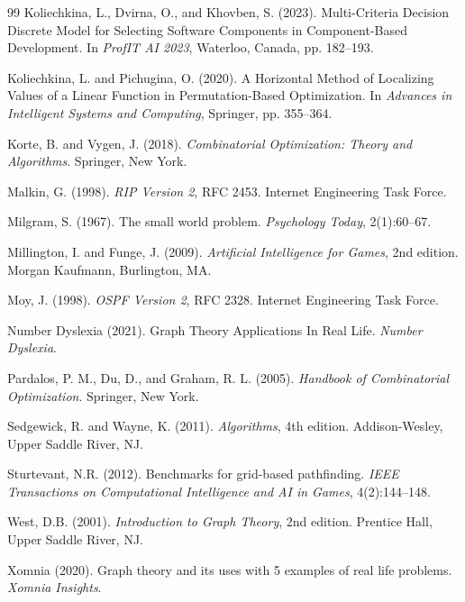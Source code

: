 \documentclass[12pt, a4paper, oneside]{report}
\theoremstyle{definition}
\begin{document}
\begin{thebibliography}{99}
Koliechkina, L., Dvirna, O., and Khovben, S. (2023).
\newblock Multi-Criteria Decision Discrete Model for Selecting Software Components in Component-Based Development.
\newblock In \emph{ProfIT AI 2023}, Waterloo, Canada, pp. 182--193.

Koliechkina, L. and Pichugina, O. (2020).
\newblock A Horizontal Method of Localizing Values of a Linear Function in Permutation-Based Optimization.
\newblock In \emph{Advances in Intelligent Systems and Computing}, Springer, pp. 355--364.

Korte, B. and Vygen, J. (2018).
\newblock \emph{Combinatorial Optimization: Theory and Algorithms}.
\newblock Springer, New York.

Malkin, G. (1998).
\newblock \emph{RIP Version 2}, RFC 2453.
\newblock Internet Engineering Task Force.

Milgram, S. (1967).
\newblock The small world problem.
\newblock \emph{Psychology Today}, 2(1):60--67.

Millington, I. and Funge, J. (2009).
\newblock \emph{Artificial Intelligence for Games}, 2nd edition.
\newblock Morgan Kaufmann, Burlington, MA.

Moy, J. (1998).
\newblock \emph{OSPF Version 2}, RFC 2328.
\newblock Internet Engineering Task Force.

Number Dyslexia (2021).
 Graph Theory Applications In Real Life.
\newblock \emph{Number Dyslexia}.

Pardalos, P. M., Du, D., and Graham, R. L. (2005).
\newblock \emph{Handbook of Combinatorial Optimization}.
\newblock Springer, New York.

Sedgewick, R. and Wayne, K. (2011).
\newblock \emph{Algorithms}, 4th edition.
\newblock Addison-Wesley, Upper Saddle River, NJ.

Sturtevant, N.R. (2012).
\newblock Benchmarks for grid-based pathfinding.
\newblock \emph{IEEE Transactions on Computational Intelligence and AI in Games}, 4(2):144--148.

West, D.B. (2001).
\newblock \emph{Introduction to Graph Theory}, 2nd edition.
\newblock Prentice Hall, Upper Saddle River, NJ.

Xomnia (2020).
\newblock Graph theory and its uses with 5 examples of real life problems.
\newblock \emph{Xomnia Insights}.

\end{thebibliography}
\end{document}
